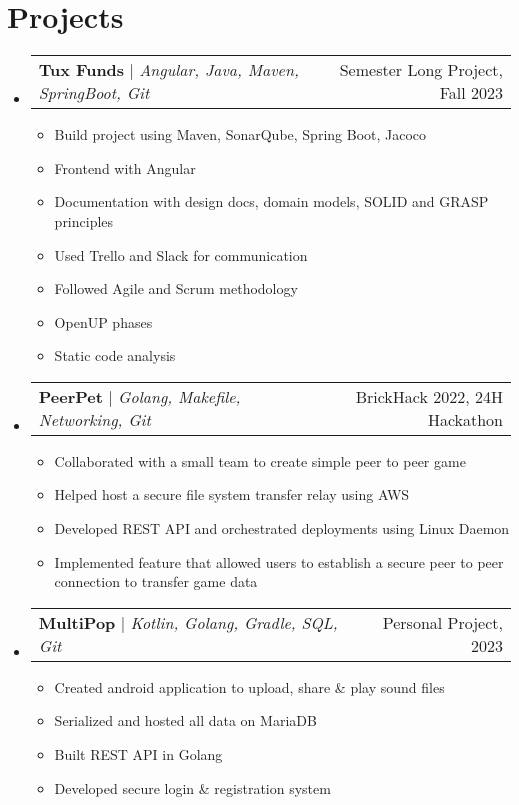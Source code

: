 \documentclass[letterpaper,11pt]{article}
\makeatletter
\newcommand{\resumeItem}[1]{
  \item\small{
    {#1 \vspace{-2pt}}
  }
}
\newcommand{\resumeProjectHeading}[2]{
    \item
    \begin{tabular*}{0.97\textwidth}{l@{\extracolsep{\fill}}r}
      \small#1 & #2 \\
    \end{tabular*}\vspace{-7pt}
}
\newcommand{\resumeSubHeadingListStart}{\begin{itemize}[leftmargin=0.15in, label={}]}
\newcommand{\resumeSubHeadingListEnd}{\end{itemize}}
\newcommand{\resumeItemListStart}{\begin{itemize}}
\newcommand{\resumeItemListEnd}{\end{itemize}\vspace{-5pt}}
\makeatother
\begin{document}
\section{Projects}
\resumeSubHeadingListStart
    \resumeProjectHeading
        {\textbf{Tux Funds} $|$ \emph{Angular, Java, Maven, SpringBoot, Git}}{Semester Long Project, Fall 2023}
    \resumeItemListStart
        \resumeItem{Build project using Maven, SonarQube, Spring Boot, Jacoco}
        \resumeItem{Frontend with Angular}
        \resumeItem{Documentation with design docs, domain models, SOLID and GRASP principles}
        \resumeItem{Used Trello and Slack for communication}
        \resumeItem{Followed Agile and Scrum methodology}
        \resumeItem{OpenUP phases}
        \resumeItem{Static code analysis}
    \resumeItemListEnd
    \resumeProjectHeading
        {\textbf{PeerPet} $|$ \emph{Golang, Makefile, Networking, Git}}{BrickHack 2022, 24H Hackathon}
    \resumeItemListStart
        \resumeItem{Collaborated with a small team to create simple peer to peer game}
        \resumeItem{Helped host a secure file system transfer relay using AWS}
        \resumeItem{Developed REST API and orchestrated deployments using Linux Daemon}
        \resumeItem{Implemented feature that allowed users to establish a secure peer to peer connection to transfer game data}
    \resumeItemListEnd
    \resumeProjectHeading
        {\textbf{MultiPop} $|$ \emph{Kotlin, Golang, Gradle, SQL, Git}}{Personal Project, 2023}
    \resumeItemListStart
        \resumeItem{Created android application to upload, share \& play sound files}
        \resumeItem{Serialized and hosted all data on MariaDB}
        \resumeItem{Built REST API in Golang}
        \resumeItem{Developed secure login \& registration system}
    \resumeItemListEnd
\resumeSubHeadingListEnd

\end{document}
